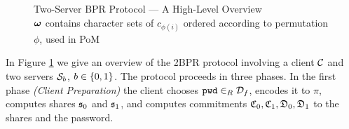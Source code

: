 \begin{figure}[!b]
{}
\caption[Two-Server BPR Protocol]{Two-Server BPR Protocol --- A High-Level Overview\\
{\small $\boldsymbol{\mathbf{\omega}}$ contains character sets of $c_{\phi(i)}$ ordered according to permutation $\phi$, used in \ac{PoM}}}
\label{fig:protocol-overview}
\end{figure}
In Figure \ref{fig:protocol-overview} we give an overview of the \ac{2BPR} protocol involving a client $\mathcal{C}$ and two servers $\mathcal{S}_b$, $b\in\{0,1\}$.
The protocol proceeds in three phases.
In the first phase \emph{(Client Preparation)} the client chooses $\mathtt{pwd}\in_R\mathcal{D}_f$, encodes it to $\pi$, computes shares $\mathfrak{s}_{0}$ and $\mathfrak{s}_{1}$, and computes commitments $\mathfrak{C}_0, \mathfrak{C}_1, \mathfrak{D}_0, \mathfrak{D}_1$ to the shares and the password.

